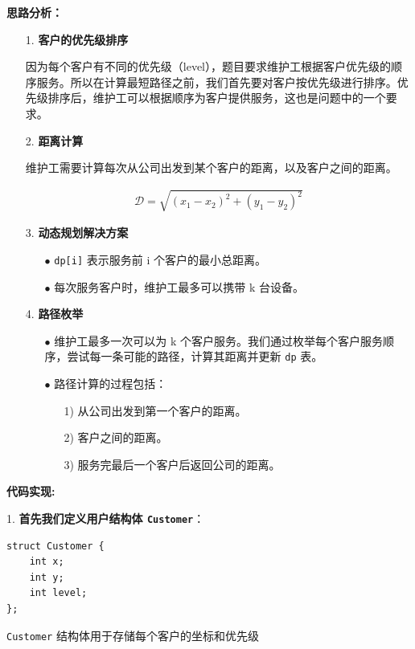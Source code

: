 \documentclass[a4paper]{ctexart}
\begin{document}
\noindent\textbf{思路分析：}
\begin{itemize}
	\item [1.] \textbf{客户的优先级排序} 
	
	因为每个客户有不同的优先级（level），题目要求维护工根据客户优先级的顺序服务。所以在计算最短路径之前，我们首先要对客户按优先级进行排序。优先级排序后，维护工可以根据顺序为客户提供服务，这也是问题中的一个要求。
	
	\item [2.] \textbf{距离计算}
	
	维护工需要计算每次从公司出发到某个客户的距离，以及客户之间的距离。
	
	\begin{equation*}
		\begin{aligned}
			\mathcal{D} = \sqrt{(x_1 - x_2)^2 + (y_1 - y_2)^2}
		\end{aligned}
		\label{eq: Euclidean distance}
	\end{equation*}	
	
	\item[3.] \textbf{动态规划解决方案}
	\begin{itemize}
		\item [$\bullet$] \texttt{dp[i]} 表示服务前 i 个客户的最小总距离。
		
		\item [$\bullet$] 每次服务客户时，维护工最多可以携带 k 台设备。
	\end{itemize}
	
	\item[4.] \textbf{路径枚举}
	\begin{itemize}
		\item[$\bullet$] 维护工最多一次可以为 k 个客户服务。我们通过枚举每个客户服务顺序，尝试每一条可能的路径，计算其距离并更新 \texttt{dp} 表。
		
		\item[$\bullet$] 路径计算的过程包括：
			\begin{itemize}
				\item[1)] 从公司出发到第一个客户的距离。
				\item[2)] 客户之间的距离。
				\item[3)] 服务完最后一个客户后返回公司的距离。
			\end{itemize}
	\end{itemize}
	
\end{itemize}

\noindent\textbf{代码实现:}

1. \textbf{首先我们定义用户结构体 \texttt{Customer}}：
\begin{lstlisting}
struct Customer {
	int x;
	int y;
	int level;
};
\end{lstlisting}
\texttt{Customer} 结构体用于存储每个客户的坐标和优先级
\end{document}
